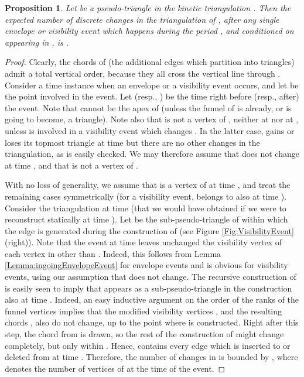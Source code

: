 \documentclass[11pt]{article}
\newtheorem{proposition}[theorem]{Proposition}
\begin{document}
\begin{proposition}\label{Thm:LogCostEvent}
  Let  be a pseudo-triangle in the kinetic triangulation
  . Then the expected number of discrete
  changes in the triangulation  of , after any single
  envelope or visibility event which happens during the period , and conditioned on  appearing in ,
  is .
\end{proposition}
\begin{proof}
  Clearly, the chords of  (the additional edges which partition  into triangles) admit a total vertical order, because
  they all cross the vertical line through .  Consider a
  time instance  when an envelope or a visibility event
  occurs, and let  be the point involved in
the event.
Let  (resp., ) be the time right before (resp., after) the event. 
Note
  that  cannot be the apex of  (unless the funnel of  is already, or is going to become, a triangle). Note also that  is not
  a vertex of , neither at  nor at , unless
   is involved in a visibility event which changes
  . In the latter case,  gains or loses
 its topmost triangle at
  time  but there are no other changes in the triangulation, as is easily checked.
 We may therefore assume that
   does not change at time
  , and that  is not a vertex of .

  With no loss of generality, we assume that  is a vertex of
   at time , and treat the remaining cases
  symmetrically (for a visibility event,  belongs to  also at time ).  Consider the triangulation  at time
   (that we would have obtained if we were to reconstruct  statically at time ).  Let  be the sub-pseudo-triangle of  within which
  the edge  is generated during the construction of  (see Figure
  \ref{Fig:VisibilityEvent} (right)).  
  Note that the event at time  leaves unchanged the visibility vertex  of each vertex  in  other than .
  Indeed, this follows from Lemma \ref{Lemma:ingoingEnvelopeEvent} for envelope events and is obvious for visibility events, using our assumption that  does not change. The recursive construction of  is easily seen to imply that 
  appears as a sub-pseudo-triangle in the construction also at time . Indeed, an easy inductive argument on the order of the ranks of the funnel vertices implies that the modified visibility vertices , and the resulting chords , also do not change, up to the point where  is constructed. Right after this step, the chord from  is drawn, so the rest of the construction of  might change completely, but only within . Hence,  contains every edge which
  is inserted to or deleted from  at time .  Therefore,
  the number of changes in  is bounded by , where
   denotes the number of vertices of  at the time of the event.



\end{proof}
\end{document}
